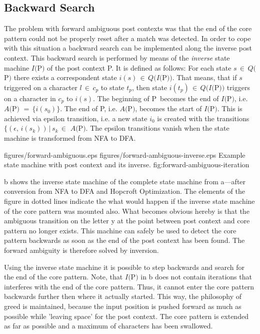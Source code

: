 \documentclass[acmtoplas]{acmtrans2m}
\newcommand{\fa}[1]{$A(${\sf #1}$)$}
\newcommand{\finv}[1]{$I(${\sf #1}$)$}
\newcommand{\pP}{{\sf P}}
\begin{document}
\subsection{Backward Search}
\label{sec:solving-forward-ambiguous}

The problem with forward ambiguous post contexts was that the end of the core
pattern could not be properly reset after a match was detected. In order to
cope with this situation a backward search can be implemented along the inverse
post context. This backward search is performed by means of the {\it inverse}
state machine \finv{P} of the post context \pP.  It is defined as follows: For
each state $s\,\in\,Q($\pP$)$ there exists a correspondent state
$i(s)\,\in\,Q(I($\pP$))$.  That means, that if $s$ triggered on a character
$l\,\in\,c_p$ to state $t_p$, then state $i(t_p)\,\in\, Q(I($\pP$))$ triggers
on a character in $c_p$ to $i(s)$.  The beginning of \pP\ becomes the end of
$I($\pP$)$, i.e.  \fa{P} $=\,\{i(s_0)\}$. The end of \pP, i.e.
$A($\pP$)$, becomes the start of \finv{P}. This is achieved via epsilon
transition, i.e.  a new state $i_0$ is created with the transitions
$\{(\epsilon,\,i(s_k))\,|\,s_k\,\in$ \fa{P}.  The epsilon transitions
vanish when the state machine is transformed from NFA to DFA.

\showdpic
{figures/forward-ambiguous.eps}
{figures/forward-ambiguous-inverse.eps}
{Example state machine with post context and its inverse.}
{fig:forward-ambiguous-iteration}
        
b shows the inverse state machine of the
complete state machine from a---after
conversion from NFA to DFA and Hopcroft Optimization. The elements of the
figure in dotted lines indicate the what would happen if the inverse state
machine of the core pattern was mounted also. What becomes obvious hereby is
that the ambiguous transition on the letter y at the point between post context
and core pattern no longer exists. This machine can safely be used to detect
the core pattern backwards as soon as the end of the post context has been
found. The forward ambiguity is therefore solved by inversion.

Using the inverse state machine it is possible to step backwards and search for
the end of the core pattern. Note, that \finv{P} in
b does not contain iterations that interferes
with the end of the core pattern. Thus, it cannot enter the core pattern
backwards further then where it actually started. This way, the philosophy of
greed is maintained, because the input position is pushed forward as much as
possible while 'leaving space' for the post context. The core pattern is
extended as far as possible and a maximum of characters has been swallowed. 
\end{document}
